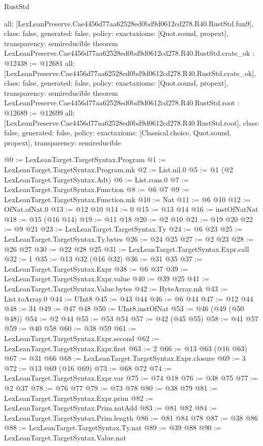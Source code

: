 \begin{lexlean}{RustStd}
\begin{coremodule}
{  all: [LexLeanPreserve.Cae4456d77aa62528ed0bd9d0612cd278.R40.RustStd.fun9],
  class: false,
  generated: false,
  policy: exact{axioms: [Quot.sound, propext]},
  transparency: semireducible
}
theorem LexLeanPreserve.Cae4456d77aa62528ed0bd9d0612cd278.R40.RustStd.crate_ok : @12438 := @12681 {
  all: [LexLeanPreserve.Cae4456d77aa62528ed0bd9d0612cd278.R40.RustStd.crate_ok],
  class: false,
  generated: false,
  policy: exact{axioms: [Quot.sound, propext]},
  transparency: semireducible
}
theorem LexLeanPreserve.Cae4456d77aa62528ed0bd9d0612cd278.R40.RustStd.root : @12689 := @12699 {
  all: [LexLeanPreserve.Cae4456d77aa62528ed0bd9d0612cd278.R40.RustStd.root],
  class: false,
  generated: false,
  policy: exact{axioms: [Classical.choice, Quot.sound, propext]},
  transparency: semireducible
}

@0 := LexLeanTarget.TargetSyntax.Program
@1 := LexLeanTarget.TargetSyntax.Program.mk
@2 := List.nil.{0}
@5 := @1 (@2 LexLeanTarget.TargetSyntax.Adt)
@6 := List.cons.{0}
@7 := LexLeanTarget.TargetSyntax.Function
@8 := @6 @7
@9 := LexLeanTarget.TargetSyntax.Function.mk
@10 := Nat
@11 := @6 @10
@12 := OfNat.ofNat.{0}
@13 := @12 @10
@14 := 0
@15 := @13 @14
@16 := instOfNatNat
@18 := @15 (@16 @14)
@19 := @11 @18
@20 := @2 @10
@21 := @19 @20
@22 := @9 @21
@23 := LexLeanTarget.TargetSyntax.Ty
@24 := @6 @23
@25 := LexLeanTarget.TargetSyntax.Ty.bytes
@26 := @24 @25
@27 := @2 @23
@28 := @26 @27
@30 := @22 @28 @25
@31 := LexLeanTarget.TargetSyntax.Expr.call
@32 := 1
@35 := @13 @32 (@16 @32)
@36 := @31 @35
@37 := LexLeanTarget.TargetSyntax.Expr
@38 := @6 @37
@39 := LexLeanTarget.TargetSyntax.Expr.value
@40 := @39 @25
@41 := LexLeanTarget.TargetSyntax.Value.bytes
@42 := ByteArray.mk
@43 := List.toArray.{0}
@44 := UInt8
@45 := @43 @44
@46 := @6 @44
@47 := @12 @44
@48 := 34
@49 := @47 @48
@50 := UInt8.instOfNat
@53 := @46 (@49 (@50 @48))
@54 := @2 @44
@55 := @53 @54
@57 := @42 (@45 @55)
@58 := @41 @57
@59 := @40 @58
@60 := @38 @59
@61 := LexLeanTarget.TargetSyntax.Expr.second
@62 := LexLeanTarget.TargetSyntax.Expr.first
@63 := 2
@66 := @13 @63 (@16 @63)
@67 := @31 @66
@68 := LexLeanTarget.TargetSyntax.Expr.closure
@69 := 3
@72 := @13 @69 (@16 @69)
@73 := @68 @72
@74 := LexLeanTarget.TargetSyntax.Expr.var
@75 := @74 @18
@76 := @38 @75
@77 := @2 @37
@78 := @76 @77
@79 := @73 @78
@80 := @38 @79
@81 := LexLeanTarget.TargetSyntax.Expr.prim
@82 := LexLeanTarget.TargetSyntax.Prim.natAdd
@83 := @81 @82
@84 := LexLeanTarget.TargetSyntax.Prim.length
@86 := @81 @84 @78
@87 := @38 @86
@88 := LexLeanTarget.TargetSyntax.Ty.nat
@89 := @39 @88
@90 := LexLeanTarget.TargetSyntax.Value.nat

\end{coremodule}
\end{lexlean}
